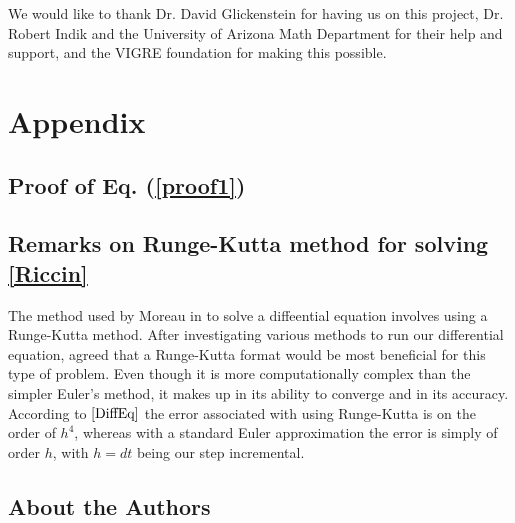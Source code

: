 \documentclass[12pt]{article}
\begin{document}
  \noindent We would like to thank Dr. David Glickenstein for having us on this project, Dr. Robert Indik and the University of Arizona Math Department for their help and support, and the VIGRE foundation for making this possible. 
  \maketitle
   
  \newpage
    
  
  
  \newpage
  \section{Appendix}
  \maketitle
  
  \subsection{Proof of Eq. (\ref{proof1})}
	\maketitle
  
  \subsection{Remarks on Runge-Kutta method for solving \ref{Riccin}}
	\maketitle

The method used by Moreau in \cite{JPM} to solve a diffeential equation involves using a Runge-Kutta method. After investigating various methods to run our differential equation, agreed that a Runge-Kutta format would be most beneficial for this type of problem. Even though it is more computationally complex than the simpler Euler's method, it makes up in its ability to converge and in its accuracy. According to $\cite{DiffEq}$ the error associated with using Runge-Kutta is on the order of $h^4$, whereas with a standard Euler approximation the error is simply of order $h$, with $h = dt$ being our step incremental. \newline
  
  \newpage
  \subsection*{About the Authors}
  \maketitle
  
\end{document}
